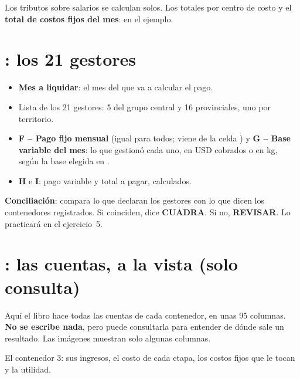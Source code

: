  Los tributos sobre salarios se calculan solos.  Los totales por centro de costo y el
\textbf{total de costos fijos del mes}: \vFijosMes{} en el ejemplo.

\section{: los 21 gestores}

\begin{itemize}
  \item {} \textbf{Mes a liquidar}: el mes del que va a calcular el pago.
  \item Lista de los 21 gestores: 5 del grupo central y 16 provinciales, uno por territorio.
  \item {} \textbf{F – Pago fijo mensual} (igual para todos; viene de la celda ) y \textbf{G – Base variable del mes}: lo que
        gestionó cada uno, en USD cobrados o en kg, según la base elegida en .
  \item \textbf{H} e \textbf{I}: pago variable y total a pagar, calculados.
\end{itemize}

 \textbf{Conciliación}: compara lo que declaran los gestores con lo que dicen los contenedores registrados. Si coinciden,
dice \textcolor{verde}{\textbf{CUADRA}}. Si no, \textcolor{rojo}{\textbf{REVISAR}}. Lo practicará en el ejercicio~5.

\section{: las cuentas, a la vista (solo consulta)}

Aquí el libro hace todas las cuentas de cada contenedor, en unas 95 columnas. \textbf{No se escribe nada}, pero puede consultarla para
entender de dónde sale un resultado. Las imágenes muestran solo algunas columnas.

 El contenedor 3: sus ingresos, el costo de cada etapa, los costos fijos que le tocan y la utilidad.

